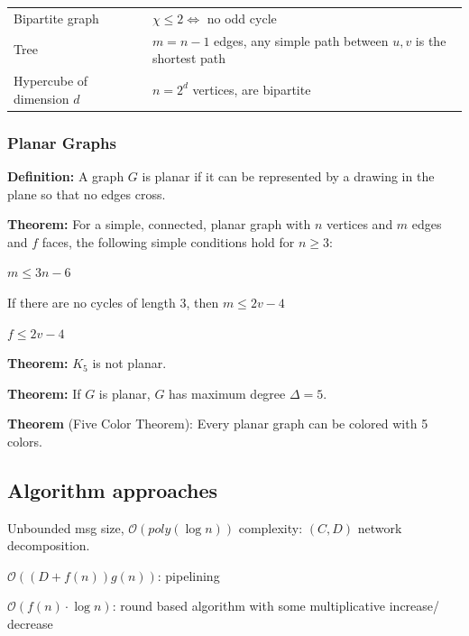 \documentclass[a4paper, 8pt, landscape]{scrartcl}
\begin{document}
\begin{multicols*}{3}
\begin{center}
\begin{tabular}{@{}p{22mm}p{50mm}@{}}
	Bipartite graph & $\chi \leq 2 \Leftrightarrow$ no odd cycle \\ 
	 
	Tree & $m = n-1$ edges, any simple path between $u,v$ is the shortest path \\ 
	 
	Hypercube of dimension $d$ & $n = 2^d$ vertices, are bipartite \\ 
	\hline 
\end{tabular} 
\end{center}

\subsubsection{Planar Graphs}

\textbf{Definition:} A graph $G$ is planar if it can be represented by a drawing in the plane so that no edges cross.

\textbf{Theorem:} For a simple, connected, planar graph with $n$ vertices and $m$ edges and $f$ faces, the following simple conditions hold for $n \geq 3$:

\begin{compactitem}
\item $m \leq 3n - 6$
\item If there are no cycles of length 3, then $m \leq 2v -4$
\item $f \leq 2v - 4$
\end{compactitem} 

\textbf{Theorem:} $K_5$ is not planar.

\textbf{Theorem:} If $G$ is planar, $G$ has maximum degree $\Delta = 5$.

\textbf{Theorem} (Five Color Theorem): Every planar graph can be colored with 5 colors.






\subsection{Algorithm approaches}

\begin{compactitem}
\item Unbounded msg size, $\mathcal{O}(poly(\log n))$ complexity: $(C,D)$ network decomposition.

\item $\mathcal{O}((D+f(n))g(n))$: pipelining

\item $\mathcal{O}(f(n)\cdot \log n)$: round based algorithm with some multiplicative increase/ decrease
	

\end{compactitem}
\end{multicols*}
\end{document}
